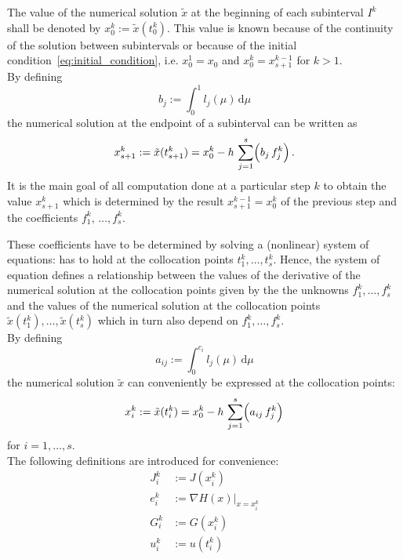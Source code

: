 \documentclass{scrartcl}
\begin{document}
The value of the numerical solution $\tilde{x}$
at the beginning of each subinterval $I^k$
shall be denoted by $x_0^k := \tilde{x}(t_0^k)$.
This value is known because of the continuity of the solution between subintervals
or because of the initial condition~\eqref{eq:initial_condition},
i.e. $x_0^1 = x_0$ and $x_0^{k} = x_{s+1}^{k-1}$ for $k > 1$. \\

By defining
\begin{equation*}
	b_j := \int_0^1 l_j(\mu) \, \mathrm{d} \mu
	\label{eq:butcher_b}
\end{equation*}
the numerical solution at the endpoint of a subinterval can be written as
\begin{equation*}
	x_{s+1}^k := \tilde{x}(t_{s+1}^k) =
	x_0^k - h \, \sum\limits_{j=1}^s \Bigl( b_j \, f_j^k \Bigr)
	\,.
\end{equation*}
It is the main goal of all computation done at a particular step $k$
to obtain the value $x_{s+1}^k$
which is determined by the result $x_{s+1}^{k-1} = x_0^k$ of the previous step
and the coefficients $f_1^k, \, \ldots, f_s^k$.

These coefficients have to be determined by solving a (nonlinear) system of equations:
 has to hold at the collocation points $t_1^k, \ldots, t_s^k$.
Hence, the system of equation defines a relationship between
the values of the derivative of the numerical solution at the collocation points
given by the the unknowns $f_1^k, \ldots, f_s^k$
and the values of the numerical solution
at the collocation points $\tilde{x}(t_1^k), \ldots, \tilde{x}(t_s^k)$
which in turn also depend on $f_1^k, \ldots, f_s^k$. \\

By defining
\begin{equation*}
	a_{ij} := \int_0^{c_i} l_j(\mu) \, \mathrm{d} \mu
	\label{eq:butcher_a}
\end{equation*}
the numerical solution $\tilde{x}$ can conveniently be expressed
at the collocation points:
\begin{equation*}
	x_i^k := \tilde{x}(t_i^k) =
	x_0^k - h \, \sum\limits_{j=1}^s \Bigl( a_{ij} \, f_j^k \Bigr)
\end{equation*}
for $i = 1, \ldots, s$. \\

The following definitions are introduced for convenience:
\begin{subequations}
	\begin{alignat*}{1}
		J_i^k &:= J(x_i^k) \\
		e_i^k &:= \left. \nabla H(x) \right|_{x = x_i^k} \\
		G_i^k &:= G(x_i^k) \\
		u_i^k &:= u(t_i^k)
	\end{alignat*}
\end{subequations}
\end{document}
